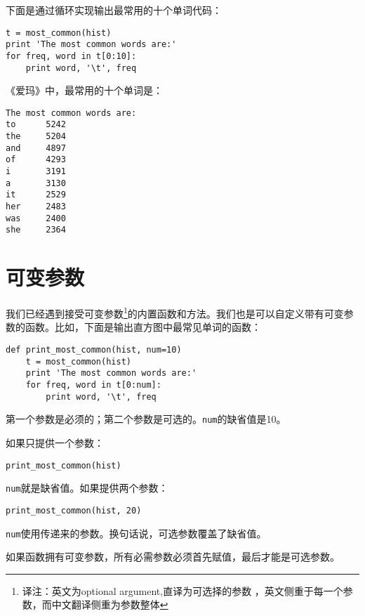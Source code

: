 下面是通过循环实现输出最常用的十个单词代码：

\beforeverb
\begin{verbatim}
t = most_common(hist)
print 'The most common words are:'
for freq, word in t[0:10]:
    print word, '\t', freq
\end{verbatim}
\afterverb
%

《爱玛》中，最常用的十个单词是：

\beforeverb
\begin{verbatim}
The most common words are:
to      5242
the     5204
and     4897
of      4293
i       3191
a       3130
it      2529
her     2483
was     2400
she     2364
\end{verbatim}
\afterverb
%

\section{可变参数}

我们已经遇到接受可变参数\footnote{译注：英文为optional argument,直译为可选择的参数
，英文侧重于每一个参数，而中文翻译侧重为参数整体}的内置函数和方法。我们也是可以自定义带有可变参数的函数。比如，下面是输出直方图中最常见单词的函数：

\beforeverb
\begin{verbatim}
def print_most_common(hist, num=10)
    t = most_common(hist)
    print 'The most common words are:'
    for freq, word in t[0:num]:
        print word, '\t', freq
\end{verbatim}
\afterverb

第一个参数是必须的；第二个参数是可选的。{\tt num}的缺省值是10。


如果只提供一个参数：

\beforeverb
\begin{verbatim}
print_most_common(hist)
\end{verbatim}
\afterverb

{\tt num}就是缺省值。如果提供两个参数：

\beforeverb
\begin{verbatim}
print_most_common(hist, 20)
\end{verbatim}
\afterverb

{\tt num}使用传递来的参数。换句话说，可选参数覆盖了缺省值。


如果函数拥有可变参数，所有必需参数必须首先赋值，最后才能是可选参数。



